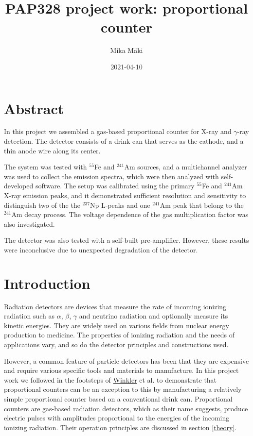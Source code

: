 \documentclass[a4paper]{article}
\title{PAP328 project work: proportional counter}
\author{Mika Mäki}
\date{2021-04-10}
\begin{document}
\maketitle

\section*{Abstract}
In this project we assembled a gas-based proportional counter for X-ray and $\gamma$-ray detection.
The detector consists of a drink can that serves as the cathode, and a thin anode wire along its center.


The system was tested with $^{55}$Fe and $^{241}$Am sources, and a multichannel analyzer was used to collect the emission spectra, which were then analyzed with self-developed software.
The setup was calibrated using the primary $^{55}$Fe and $^{241}$Am X-ray emission peaks, and it demonstrated sufficient resolution  and sensitivity to distinguish two of the the $^{237}$Np L-peaks and one $^{241}$Am peak that belong to the $^{241}$Am decay process.
The voltage dependence of the gas multiplication factor was also investigated.

The detector was also tested with a self-built pre-amplifier.
However, these results were inconclusive due to unexpected degradation of the detector.

\tableofcontents


\section{Introduction}
\label{introduction}
Radiation detectors are devices that measure the rate of incoming ionizing radiation such as $\alpha$, $\beta$, $\gamma$ and neutrino radiation and optionally measure its kinetic energies.
They are widely used on various fields from nuclear energy production to medicine.
The properties of ionizing radiation and the needs of applications vary, and so do the detector principles and constructions used.

However, a common feature of particle detectors has been that they are expensive and require various specific tools and materials to manufacture.
In this project work we followed in the footsteps of
\href{https://www.helsinki.fi/en/people/people-finder/alexander-winkler-9110087}{Winkler}
et al. \cite{winkler_gaseous_2015} to demonstrate that proportional counters can be an exception to this by manufacturing a relatively simple proportional counter based on a conventional drink can.
Proportional counters are gas-based radiation detectors, which as their name suggests, produce electric pulses with amplitudes proportional to the energies of the incoming ionizing radiation.
Their operation principles are discussed in section \ref{theory}.
\end{document}
